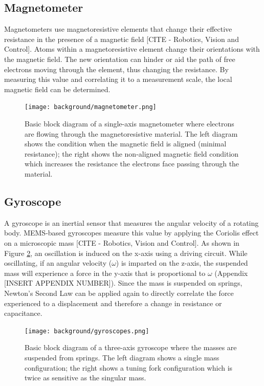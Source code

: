 \subsection{Magnetometer} \label{ssec:bkg_magnetometer}
Magnetometers use magnetoresistive elements that change their effective resistance in the presence of a magnetic field [CITE - Robotics, Vision and Control].
Atoms within a magnetoresistive element change their orientations with the magnetic field.
The new orientation can hinder or aid the path of free electrons moving through the element, thus changing the resistance.
By measuring this value and correlating it to a measurement scale, the local magnetic field can be determined.

\begin{figure}[h!]
    \caption[Magnetometer block diagram]{Basic block diagram of a single-axis magnetometer where electrons are flowing through the magnetoresistive material. The left diagram shows the condition when the magnetic field is aligned (minimal resistance); the right shows the non-aligned magnetic field condition which increases the resistance the electrons face passing through the material.}
    \label{fig:magnetometer}
    \centering
    \texttt{[image: background/magnetometer.png]}
\end{figure}

\subsection{Gyroscope} \label{ssec:bkg_gyroscope}
A gyroscope is an inertial sensor that measures the angular velocity of a rotating body.
MEMS-based gyroscopes measure this value by applying the Coriolis effect on a microscopic mass [CITE - Robotics, Vision and Control].
As shown in Figure \ref{fig:gyroscopes}, an oscillation is induced on the x-axis using a driving circuit.
While oscillating, if an angular velocity ($\omega$) is imparted on the z-axis, the suspended mass will experience a force in the y-axis that is proportional to $\omega$ (Appendix [INSERT APPENDIX NUMBER]).
Since the mass is suspended on springs, Newton's Second Law can be applied again to directly correlate the force experienced to a displacement and therefore a change in resistance or capacitance.

\begin{figure}[h!]
    \caption[Gyroscope block diagram]{Basic block diagram of a three-axis gyroscope where the masses are suspended from springs. The left diagram shows a single mass configuration; the right shows a tuning fork configuration which is twice as sensitive as the singular mass.}
    \label{fig:gyroscopes}
    \centering
    \texttt{[image: background/gyroscopes.png]}
\end{figure}

